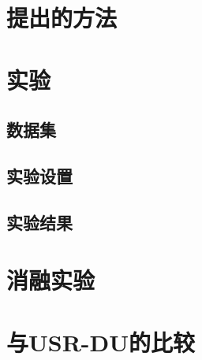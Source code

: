 \section{提出的方法}

\section{实验}
\subsection{数据集}

\subsection{实验设置}

\subsection{实验结果}

\section{消融实验}

\section{与USR-DU的比较}
